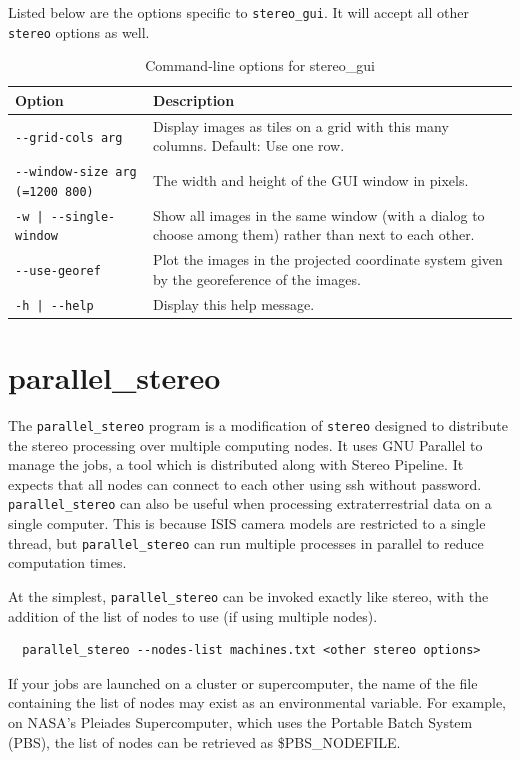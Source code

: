 Listed below are the options specific to \texttt{stereo\_gui}. It will accept
all other \texttt{stereo} options as well.

\begin{longtable}{|l|p{7.5cm}|}
\caption{Command-line options for stereo\_gui}
\label{tbl:stereogui}
\endfirsthead
\endhead
\endfoot
\endlastfoot
\hline
Option & Description \\ \hline \hline
\texttt{-\/-grid-cols arg} & Display images as tiles on a grid with this many columns. Default: Use one row.\\ \hline
\texttt{-\/-window-size arg (=1200 800)} & The width and height of the GUI window in pixels.\\ \hline
\texttt{-w | -\/-single-window } & Show all images in the same window (with a dialog to choose among them) rather than next to each other.\\ \hline
\texttt{-\/-use-georef} & Plot the images in the projected coordinate system given by the georeference of the images.\\ \hline
\texttt{-h | -\/-help } & Display this help message.\\ \hline
\end{longtable}

\section{parallel\_stereo}
\label{parallel}

The \texttt{parallel\_stereo} program is a modification of
\texttt{stereo} designed to distribute the stereo processing over
multiple computing nodes. It uses GNU Parallel to manage the jobs, a tool which
is distributed along with Stereo Pipeline. It expects that all nodes
can connect to each other using ssh without password. \texttt{parallel\_stereo}
can also be useful when processing extraterrestrial data on a single computer.
This is because ISIS camera models are restricted to a single thread, but
\texttt{parallel\_stereo} can run multiple processes in parallel to reduce
computation times.

At the simplest, \texttt{parallel\_stereo} can be invoked exactly like stereo,
with the addition of the list of nodes to use (if using multiple nodes).

\begin{verbatim}
  parallel_stereo --nodes-list machines.txt <other stereo options>
\end{verbatim}

If your jobs are launched on a cluster or supercomputer, the name of the
file containing the list of nodes may exist as an environmental
variable. For example, on NASA's Pleiades Supercomputer, which uses the
Portable Batch System (PBS), the list of nodes can be retrieved as
\$PBS\_NODEFILE.

